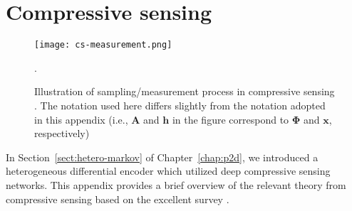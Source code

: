 \chapter{Compressive sensing}
\label{appdx:compressed-sensing}

\begin{figure}[!hbtp] \centering 
    \texttt{[image: cs-measurement.png]}
    \label{fig:cs-measurement} \vspace*{-2mm}
    \caption{Illustration of sampling/measurement process in compressive sensing \cite{ref:Marques2019ReviewOfSparseRecovery}. The notation used here differs slightly from the notation adopted in this appendix (i.e., $\mathbf{A}$ and $\mathbf{h}$ in the figure correspond to $\mathbf{\Phi}$ and $\mathbf{x}$, respectively)}.
\end{figure}

In Section~\ref{sect:hetero-markov} of Chapter~\ref{chap:p2d}, we introduced a heterogeneous differential encoder which utilized deep compressive sensing networks. This appendix provides a brief overview of the relevant theory from compressive sensing based on the excellent survey \cite{ref:Marques2019ReviewOfSparseRecovery}.

